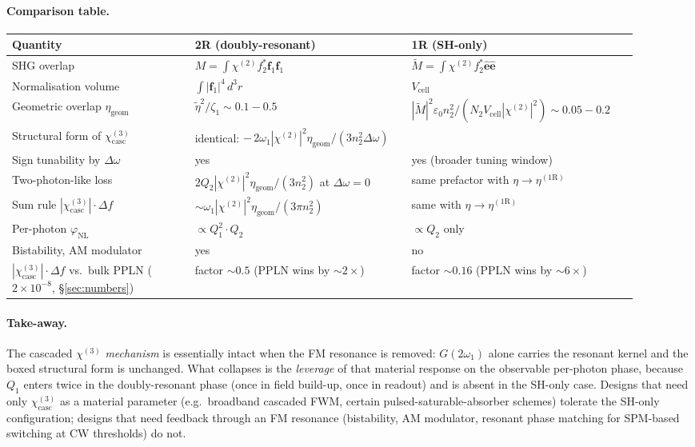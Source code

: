 \documentclass[11pt,a4paper]{article}
\newcommand{\eps}{\varepsilon}
\newcommand{\bvec}[1]{\mathbf{#1}}
\newcommand{\f}{\bvec{f}}
\newcommand{\dthreer}{\,d^{3}r}
\newcommand{\chitwo}{\chi^{(2)}}
\newcommand{\chithree}{\chi^{(3)}}
\newcommand{\Dom}{\Delta\omega}
\newcommand{\chicasc}{\chi^{(3)}_{\text{casc}}}
\newcommand{\Vunit}{V_{\text{cell}}}
\begin{document}
\paragraph{Comparison table.}
\begin{center}\small
\begin{tabular}{p{0.27\linewidth}p{0.32\linewidth}p{0.32\linewidth}}
  \toprule
  Quantity & 2R (doubly-resonant) & 1R (SH-only) \\
  \midrule
  SHG overlap
   & $M=\!\int\chitwo f_{2}^{*}\f_{1}\f_{1}$
   & $\widetilde M=\!\int\chitwo f_{2}^{*}\hat{\bm e}\hat{\bm e}$ \\[2pt]
  Normalisation volume
   & $\int|\f_1|^{4}\dthreer$
   & $\Vunit$ \\[2pt]
  Geometric overlap $\eta_\text{geom}$
   & $\widetilde\eta^{2}/\zeta_1\sim 0.1\!-\!0.5$
   & $|\widetilde M|^{2}\eps_0 n_2^{2}/(N_2\Vunit|\chitwo|^{2})\sim 0.05\!-\!0.2$ \\[2pt]
  Structural form of $\chicasc$
   & \multicolumn{2}{p{0.66\linewidth}}{\quad identical: $-\,2\omega_1|\chitwo|^{2}\eta_\text{geom}/(3 n_2^{2}\Dom)$} \\[2pt]
  Sign tunability by $\Dom$
   & yes
   & yes (broader tuning window) \\[2pt]
  Two-photon-like loss
   & $2Q_2|\chitwo|^2\eta_\text{geom}/(3 n_2^{2})$ at $\Dom=0$
   & same prefactor with $\eta\to\eta^{(1\mathrm R)}$ \\[2pt]
  Sum rule $|\chicasc|\!\cdot\!\Delta f$
   & $\sim\omega_1|\chitwo|^{2}\eta_\text{geom}/(3\pi n_2^{2})$
   & same with $\eta\to\eta^{(1\mathrm R)}$ \\[2pt]
  Per-photon $\varphi_\text{NL}$
   & $\propto Q_1^{2}\cdot Q_2$
   & $\propto Q_2$ only \\[2pt]
  Bistability, AM modulator
   & yes
   & no \\[2pt]
  $|\chicasc|\!\cdot\!\Delta f$ vs.\ bulk PPLN ($2\!\times\!10^{-8}$, \S\ref{sec:numbers})
   & factor $\sim 0.5$ (PPLN wins by $\sim 2\times$)
   & factor $\sim 0.16$ (PPLN wins by $\sim 6\times$) \\
  \bottomrule
\end{tabular}
\end{center}

\paragraph{Take-away.}
The cascaded $\chithree$ \emph{mechanism} is essentially intact when the
FM resonance is removed: $G(2\omega_1)$ alone carries the resonant kernel
and the boxed structural form is unchanged.  What collapses is the
\emph{leverage} of that material response on the observable per-photon
phase, because $Q_1$ enters twice in the doubly-resonant phase
(once in field build-up, once in readout) and is absent in the SH-only
case.  Designs that need only $\chithree_\text{casc}$ as a material
parameter (e.g.\ broadband cascaded FWM, certain pulsed-saturable-absorber
schemes) tolerate the SH-only configuration; designs that need feedback
through an FM resonance (bistability, AM modulator, resonant phase
matching for SPM-based switching at CW thresholds) do not.
\end{document}
